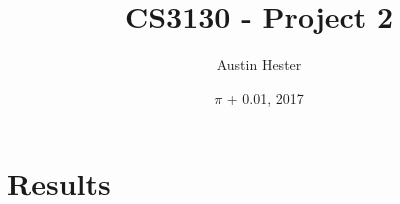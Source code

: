 \documentclass{article}
\begin{document}
\title{CS3130 - Project 2}
\author{Austin Hester}
\date{$\pi$ + 0.01, 2017}
\maketitle


\makeatletter
\def\@seccntformat#1{%
	 \expandafter\ifx\csname c@#1\endcsname\c@section\else
	  \csname the#1\endcsname\quad
  \fi}
\makeatother



\section{Results}
\end{document}
